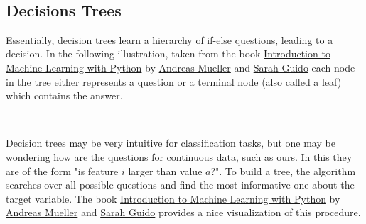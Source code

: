 \documentclass[11pt]{article}
\begin{document}
{    \begin{center}
    \end{center}
    { \hspace*{\fill} \\}
    
    \subsection{Decisions Trees}\label{decisions-trees}

\hspace{0.5cm} Essentially, decision trees learn a hierarchy of if-else questions,
leading to a decision. In the following illustration, taken from the book
\href{http://shop.oreilly.com/product/0636920030515.do}{Introduction to
Machine Learning with Python} by \href{http://amueller.io/}{Andreas
Mueller} and \href{https://twitter.com/sarah_guido}{Sarah Guido} each
node in the tree either represents a question or a terminal node (also
called a leaf) which contains the answer.

    \begin{center}
    \end{center}
    { \hspace*{\fill} \\}
    
    Decision trees may be very intuitive for classification tasks, but one
may be wondering how are the questions for continuous data, such as
ours. In this they are of the form "is feature \(i\) larger than value
\(a\)?". To build a tree, the algorithm searches over all possible
questions and find the most informative one about the target variable.
The book
\href{http://shop.oreilly.com/product/0636920030515.do}{Introduction to
Machine Learning with Python} by \href{http://amueller.io/}{Andreas
Mueller} and \href{https://twitter.com/sarah_guido}{Sarah Guido}
provides a nice visualization of this procedure.

    \begin{center}
    \end{center}
    { \hspace*{\fill} \\}
    
    \begin{center}
    \end{center}
    { \hspace*{\fill} \\}
    
}
\end{document}
